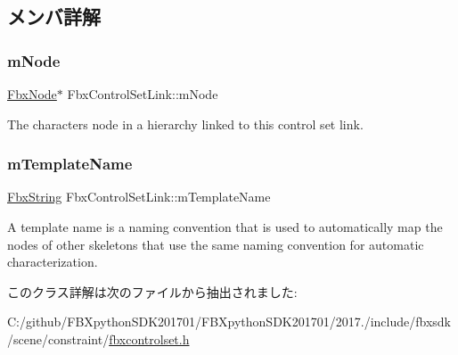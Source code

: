 \subsection{メンバ詳解}
\mbox{\label{class_fbx_control_set_link_a3996e9ed3db015da6c94b9f6c9b7c4f9}} 
\subsubsection{\texorpdfstring{m\+Node}{mNode}}
{\footnotesize\ttfamily \hyperlink{class_fbx_node}{Fbx\+Node}$\ast$ Fbx\+Control\+Set\+Link\+::m\+Node}



The character\textquotesingle{}s node in a hierarchy linked to this control set link. 

\mbox{\label{class_fbx_control_set_link_ac35309cd74ccd53e6b69273fafafbf7e}} 
\subsubsection{\texorpdfstring{m\+Template\+Name}{mTemplateName}}
{\footnotesize\ttfamily \hyperlink{class_fbx_string}{Fbx\+String} Fbx\+Control\+Set\+Link\+::m\+Template\+Name}

A template name is a naming convention that is used to automatically map the nodes of other skeletons that use the same naming convention for automatic characterization. 

このクラス詳解は次のファイルから抽出されました\+:\begin{DoxyCompactItemize}
\item 
C\+:/github/\+F\+B\+Xpython\+S\+D\+K201701/\+F\+B\+Xpython\+S\+D\+K201701/2017./include/fbxsdk/scene/constraint/\hyperlink{fbxcontrolset_8h}{fbxcontrolset.\+h}\end{DoxyCompactItemize}

